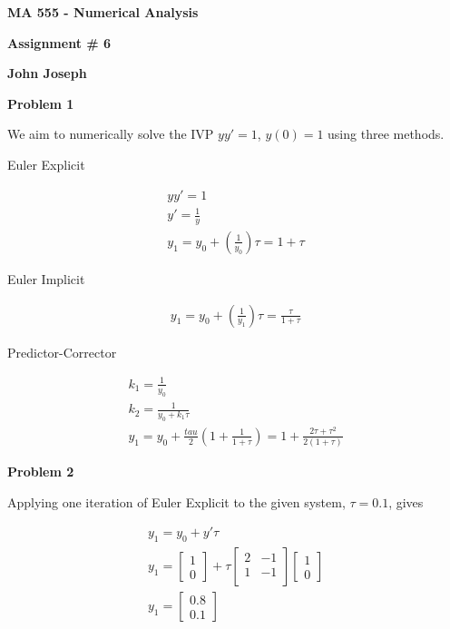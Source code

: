 \documentclass[a4paper,12pt]{article}
\begin{document}
\begin{center}

{\Large\bf MA 555 - Numerical Analysis}

\bigskip

{\large\bf Assignment \# 6}
\smallskip

{\large\bf John Joseph}
\end{center}

{\bf Problem 1}
\smallskip

We aim to numerically solve the IVP $yy'=1$, $y(0)=1$ using three methods. 
\smallskip

Euler Explicit

\begin{eqnarray*}
yy'=1 \\
y'=\frac{1}{y} \\
y_1=y_0+(\frac{1}{y_0}) \tau=1+\tau
\end{eqnarray*}

Euler Implicit

\begin{eqnarray*}
y_1=y_0+(\frac{1}{y_1}) \tau=\frac{\tau}{1+\tau}
\end{eqnarray*}

Predictor-Corrector

\begin{eqnarray*}
k_1=\frac{1}{y_0} \\
k_2=\frac{1}{y_0+k_1 \tau} \\
y_1=y_0+\frac{tau}{2}(1+\frac{1}{1+\tau}) = 1+\frac{2 \tau+\tau^2}{2(1+\tau)}
\end{eqnarray*}

{\bf Problem 2}
\smallskip

Applying one iteration of Euler Explicit to the given system, $\tau=0.1$, gives

\begin{eqnarray*}
y_1=y_0+y'\tau \\
 y_1=\begin{bmatrix}
	1 \\
	0 
	\end{bmatrix}+\tau
	\begin{bmatrix}
	2 & -1  \\[0.2em]
	1 & -1  \\[0.2em]
     \end{bmatrix}
\begin{bmatrix}
	1 \\
	0 
	\end{bmatrix} \\
y_1=\begin{bmatrix}
	0.8 \\
	0.1 
	\end{bmatrix}
\end{eqnarray*}
\end{document}
